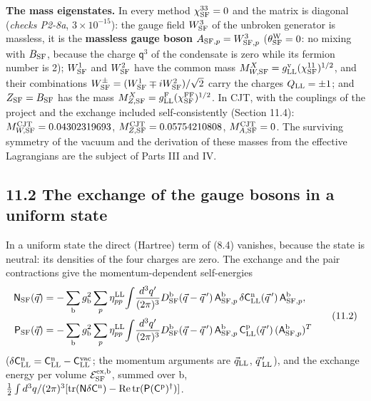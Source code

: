 \documentclass[
  10pt,
]{article}
\begin{document}
\textbf{The mass eigenstates.} In every method \(\chi^{33}_{\rm SF}=0\)
and the matrix is diagonal (\emph{checks P2-8a}, \(3\times10^{-15}\)):
the gauge field \(W^3_{\rm SF}\) of the unbroken generator is massless,
it is the \textbf{massless gauge boson}
\(A_{{\rm SF},p}=W^3_{{\rm SF},p}\) (\(\theta^{\rm W}_{\rm SF}=0\): no
mixing with \(B_{\rm SF}\), because the charge \(\mathsf q^3\) of the
condensate is zero while its fermion number is 2); \(W^1_{\rm SF}\) and
\(W^2_{\rm SF}\) have the common mass
\(M^X_{W,{\rm SF}}=g^{\rm v}_{\rm LL}(\chi^{11}_{\rm SF})^{1/2}\), and
their combinations
\(W^\pm_{\rm SF}=(W^1_{\rm SF}\mp iW^2_{\rm SF})/\sqrt2\) carry the
charges \(Q_{\rm LL}=\pm1\); and \(Z_{\rm SF}=B_{\rm SF}\) has the mass
\(M^X_{Z,{\rm SF}}=g^{\rm F}_{\rm LL}(\chi^{\rm FF}_{\rm SF})^{1/2}\).
In CJT, with the couplings of the project and the exchange included
self-consistently (Section 11.4):
\(M^{\rm CJT}_{W,{\rm SF}}=0.04302319693\),
\(M^{\rm CJT}_{Z,{\rm SF}}=0.05754210808\),
\(M^{\rm CJT}_{A,{\rm SF}}=0\). The surviving symmetry of the vacuum and
the derivation of these masses from the effective Lagrangians are the
subject of Parts III and IV.

\hypertarget{the-exchange-of-the-gauge-bosons-in-a-uniform-state}{%
\subsection{11.2 The exchange of the gauge bosons in a uniform
state}\label{the-exchange-of-the-gauge-bosons-in-a-uniform-state}}

In a uniform state the direct (Hartree) term of (8.4) vanishes, because
the state is neutral: its densities of the four charges are zero. The
exchange and the pair contractions give the momentum-dependent
self-energies
\[\begin{aligned}\mathsf N_{\rm SF}(\vec q)&=-\sum_{\rm b}g_{\rm b}^2\sum_p\eta^{\rm LL}_{pp}\!\int\!\frac{d^3q'}{(2\pi)^3}D^{\rm b}_{\rm SF}(\vec q-\vec q\,')\,\mathsf A^{\rm b}_{{\rm SF},p}\,\delta\mathsf C^{\rm n}_{\rm LL}(\vec q\,')\,\mathsf A^{\rm b}_{{\rm SF},p},\\\mathsf P_{\rm SF}(\vec q)&=-\sum_{\rm b}g_{\rm b}^2\sum_p\eta^{\rm LL}_{pp}\!\int\!\frac{d^3q'}{(2\pi)^3}D^{\rm b}_{\rm SF}(\vec q-\vec q\,')\,\mathsf A^{\rm b}_{{\rm SF},p}\,\mathsf C^{\rm p}_{\rm LL}(\vec q\,')\,(\mathsf A^{\rm b}_{{\rm SF},p})^T\end{aligned}\tag{11.2}\]
(\(\delta\mathsf C^{\rm n}_{\rm LL}=\mathsf C^{\rm n}_{\rm LL}-\mathsf C^{\rm vac}_{\rm LL}\);
the momentum arguments are \(\vec q_{\rm LL}\), \(\vec q\,'_{\rm LL}\)),
and the exchange energy per volume \(\mathcal E^{\rm ex,b}_{\rm SF}\),
summed over b,
\(\tfrac12\int d^3q/(2\pi)^3[\mathrm{tr}(\mathsf N\delta\mathsf C^{\rm n})-\mathrm{Re}\,\mathrm{tr}(\mathsf P(\mathsf C^{\rm p})^\dagger)]\).
\end{document}
